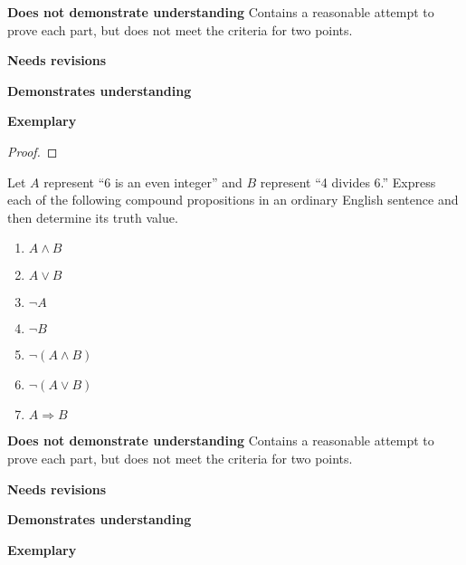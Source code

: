 \documentclass[letterpaper, 11pt]{../ximera}
\begin{document}
\begin{writeRubric}
    \item \textbf{Does not demonstrate understanding}
     Contains a reasonable attempt to prove each part, but does not meet the criteria for two points.
    \item \textbf{Needs revisions}
     
    \item \textbf{Demonstrates understanding}
    
    \item \textbf{Exemplary}
        
\end{writeRubric}
                                       
\begin{proof}
\end{proof}

\begin{ex} Let $A$ represent ``6 is an even integer” and $B$ represent ``4 divides 6.” Express each of the following compound propositions in an ordinary English sentence and then determine its truth value.
\begin{enumerate}[label=\alph*.]
	 \item $A\land B$
	 \item $A\lor B$
	 \item $\neg A$
	 \item $\neg B$
	 \item $\neg (A\land B)$
	 \item $\neg(A\lor B)$
	 \item $A\Rightarrow B$
\end{enumerate}
\end{ex}

\begin{writeRubric}
    \item \textbf{Does not demonstrate understanding}
     Contains a reasonable attempt to prove each part, but does not meet the criteria for two points.
    \item \textbf{Needs revisions}
     
    \item \textbf{Demonstrates understanding}
    
    \item \textbf{Exemplary}
        
\end{writeRubric}
                                       
\end{document}
